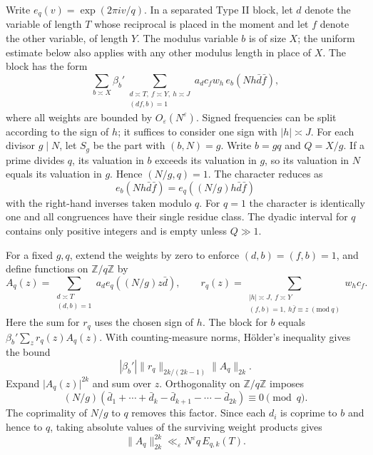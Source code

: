 \documentclass[11pt]{amsart}
\numberwithin{equation}{section}
\theoremstyle{remark}
\begin{document}
Write \(e_q(v)=\exp(2\pi i v/q)\).
In a separated Type II block, let \(d\) denote the variable of length
\(T\) whose reciprocal is placed in the moment and let \(f\) denote the
other variable, of length \(Y\). The modulus variable \(b\) is of size
\(X\); the uniform estimate below also applies with any other modulus
length in place of \(X\).
The block has the form
\[
 \sum_{b\asymp X}\beta_b'
 \sum_{\substack{d\asymp T,\ f\asymp Y,\ h\asymp J\\(df,b)=1}}
       a_d c_f w_h\, e_b(Nh\bar d\bar f),
\]
where all weights are bounded by \(O_\varepsilon(N^\varepsilon)\).
Signed frequencies can be split according to the sign of \(h\); it
suffices to consider one sign with \(\lvert h\rvert\asymp J\).
For each divisor \(g\mid N\), let \(S_g\) be the part with \((b,N)=g\).
Write \(b=gq\) and \(Q=X/g\). If a prime divides \(q\), its valuation in
\(b\) exceeds its valuation in \(g\), so its valuation in \(N\) equals
its valuation in \(g\). Hence \((N/g,q)=1\).
The character reduces as
\[
  e_b(Nh\bar d\bar f)=e_q((N/g)h\bar d\bar f)
\]
with the right-hand inverses taken modulo \(q\). For \(q=1\) the
character is identically one and all congruences have their single
residue class. The dyadic interval for \(q\) contains only positive
integers and is empty unless \(Q\gg1\).

For a fixed \(g,q\), extend the weights by zero to enforce
\((d,b)=(f,b)=1\), and define functions on \(\mathbb Z/q\mathbb Z\) by
\[
 A_q(z)=\sum_{\substack{d\asymp T\\(d,b)=1}}
                a_d e_q((N/g)z\bar d),\qquad
 r_q(z)=
  \sum_{\substack{\lvert h\rvert\asymp J,\ f\asymp Y\\
                   (f,b)=1,\ h\bar f\equiv z\;(\mathrm{mod}\ q)}} w_h c_f .
\]
Here the sum for \(r_q\) uses the chosen sign of \(h\).
The block for \(b\) equals \(\beta_b'\sum_z r_q(z)A_q(z)\).
With counting-measure norms, H\"older's inequality gives the bound
\[
 |\beta_b'|\|r_q\|_{2k/(2k-1)}\|A_q\|_{2k}.
\]
Expand \(\lvert A_q(z)\rvert^{2k}\) and sum over \(z\).
Orthogonality on \(\mathbb Z/q\mathbb Z\) imposes
\[
 (N/g)(\bar d_1+\cdots+\bar d_k-
 \bar d_{k+1}-\cdots-\bar d_{2k})\equiv0\pmod q.
\]
The coprimality of \(N/g\) to \(q\) removes this factor. Since each
\(d_i\) is coprime to \(b\) and hence to \(q\), taking absolute values
of the surviving weight products gives
\begin{equation}
 \|A_q\|_{2k}^{2k}\ll_\varepsilon N^\varepsilon q\,E_{q,k}(T).
 \label{eq:target-orthog-moment}
\end{equation}
\end{document}
